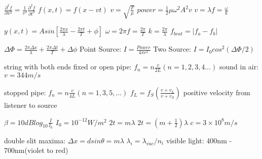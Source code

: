 \documentclass{exam}
\begin{document}
$\frac{\partial^2f}{\partial x^2}=\frac{1}{v^2}\frac{\partial^2f}{\partial t^2}$ 
$f(x,t) = f(x - vt)$
$v=\sqrt{\frac{F}{\mu}}$
$power = \frac{1}{2} \mu \omega^2 A^2 v$
$v = \lambda f = \frac{\omega}{k}$

$y(x,t) = A sin\left[\frac{2\pi x}{\lambda}-\frac{2\pi t}{T}+\phi\right]$
$\omega = 2\pi f = \frac{2\pi}{T}$
$k=\frac{2\pi}{\lambda}$
$f_{beat}=|f_a-f_b|$

$\Delta \Phi = \frac{2\pi \Delta x}{\lambda}+\frac{2\pi \Delta t}{T}+\Delta \phi$
Point Source: $I = \frac{Power}{4\pi r^2}$
Two Source: $I = I_0 cos^2(\Delta \Phi/2)$




string with both ends fixed or open pipe: $f_n=n\frac{v}{2L}(n=1,2,3,4...)$
sound in air: $v=344m/s$

stopped pipe: $f_n = n\frac{v}{4L} (n=1, 3, 5, ...)$
$f_L=f_S\left( \frac{v+v_L}{v+v_S}\right)$ positive velocity from listener to source

$\beta = 10dB log_{10}\frac{I}{I_0}$
\hspace{2mm}
$I_0=10^{-12}W/m^2$
$2t = m\lambda$
\hspace{4mm}
$2t = (m+\frac{1}{2})\lambda$
$c = 3\times10^8m/s$


double slit maxima: $\Delta x = d sin\theta = m\lambda$
$\lambda_i = \lambda_{vac}/n_i$
visible light: 400nm - 700nm(violet to red)
\end{document}
